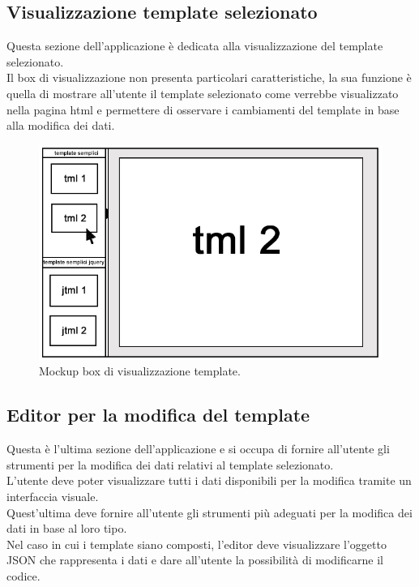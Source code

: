 \subsection{Visualizzazione template selezionato}
Questa sezione dell'applicazione è dedicata alla visualizzazione del template selezionato.\\
Il box di visualizzazione non presenta particolari caratteristiche, la sua funzione è quella di mostrare all'utente il template selezionato come verrebbe visualizzato nella pagina html e permettere di osservare i cambiamenti del template in base alla modifica dei dati.
\begin{figure}[htp]
	\centering
	\includegraphics[scale=0.45]{../immagini/mockup_view}
	\caption{Mockup box di visualizzazione template.}
\end{figure}
\subsection{Editor per la modifica del template}
Questa è l'ultima sezione dell'applicazione e si occupa di fornire all'utente gli strumenti per la modifica dei dati relativi al template selezionato.\\
L'utente deve poter visualizzare tutti i dati disponibili per la modifica tramite un interfaccia visuale.\\
Quest'ultima deve fornire all'utente gli strumenti più adeguati per la modifica dei dati in base al loro tipo.\\
Nel caso in cui i template siano composti, l'editor deve visualizzare l'oggetto JSON che rappresenta i dati e dare all'utente la possibilità di modificarne il codice.

